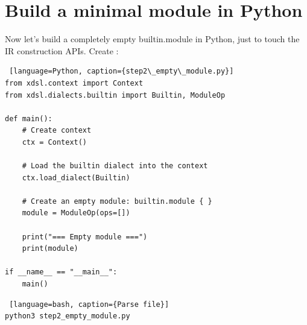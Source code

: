 \documentclass[../main.tex]{subfiles}
\begin{document}
\section{Build a minimal module in Python}
Now let’s build a completely empty builtin.module in Python, just to touch the IR construction APIs.
Create :
\begin{lstlisting} [language=Python, caption={step2\_empty\_module.py}]
from xdsl.context import Context
from xdsl.dialects.builtin import Builtin, ModuleOp

def main():
    # Create context
    ctx = Context()

    # Load the builtin dialect into the context
    ctx.load_dialect(Builtin)

    # Create an empty module: builtin.module { }
    module = ModuleOp(ops=[])

    print("=== Empty module ===")
    print(module)

if __name__ == "__main__":
    main()
\end{lstlisting}

\begin{lstlisting} [language=bash, caption={Parse file}]
python3 step2_empty_module.py
\end{lstlisting}
\end{document}
